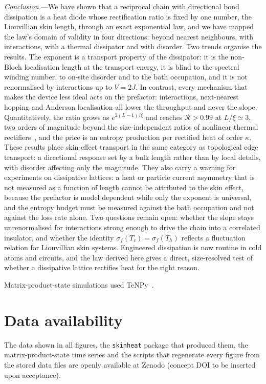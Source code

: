 \documentclass[reprint,aps,prl,superscriptaddress,nofootinbib,floatfix]{revtex4-2}
\newcommand{\R}{\mathcal{R}}
\begin{document}
\textit{Conclusion.}---We have shown that a reciprocal chain with directional bond dissipation is a heat diode whose rectification ratio is fixed by one number, the Liouvillian skin length, through an exact exponential law, and we have mapped the law's domain of validity in four directions: beyond nearest neighbours, with interactions, with a thermal dissipator and with disorder.
Two trends organise the results. The exponent is a transport property of the dissipator: it is the non-Bloch localisation length at the transport energy, it is blind to the spectral winding number, to on-site disorder and to the bath occupation, and it is not renormalised by interactions up to $V=2J$. In contrast, every mechanism that makes the device less ideal acts on the prefactor: interactions, next-nearest hopping and Anderson localisation all lower the throughput and never the slope. Quantitatively, the ratio grows as $e^{2(L-1)/\xi}$ and reaches $\R>0.99$ at $L/\xi\simeq3$, two orders of magnitude beyond the size-independent ratios of nonlinear thermal rectifiers~\cite{Li2012}, and the price is an entropy production per rectified heat of order $\kappa$.
These results place skin-effect transport in the same category as topological edge transport: a directional response set by a bulk length rather than by local details, with disorder affecting only the magnitude. They also carry a warning for experiments on dissipative lattices: a heat or particle current asymmetry that is not measured as a function of length cannot be attributed to the skin effect, because the prefactor is model dependent while only the exponent is universal, and the entropy budget must be measured against the bath occupation and not against the loss rate alone. Two questions remain open: whether the slope stays unrenormalised for interactions strong enough to drive the chain into a correlated insulator, and whether the identity $\sigma_f(T_c)=\sigma_f(T_h)$ reflects a fluctuation relation for Liouvillian skin systems. Engineered dissipation is now routine in cold atoms and circuits, and the law derived here gives a direct, size-resolved test of whether a dissipative lattice rectifies heat for the right reason.

\begin{acknowledgments}
Matrix-product-state simulations used TeNPy~\cite{Hauschild2018}.
\end{acknowledgments}

\section*{Data availability}
The data shown in all figures, the \texttt{skinheat} package that produced them, the matrix-product-state time series and the scripts that regenerate every figure from the stored data files are openly available at Zenodo (concept DOI to be inserted upon acceptance).
\end{document}
